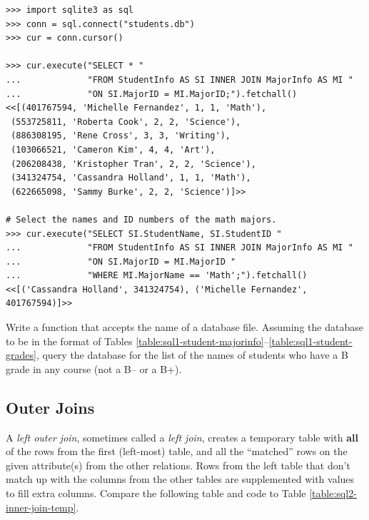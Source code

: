 \begin{lstlisting}
>>> import sqlite3 as sql
>>> conn = sql.connect("students.db")
>>> cur = conn.cursor()

>>> cur.execute("SELECT * "
...             "FROM StudentInfo AS SI INNER JOIN MajorInfo AS MI "
...             "ON SI.MajorID = MI.MajorID;").fetchall()
<<[(401767594, 'Michelle Fernandez', 1, 1, 'Math'),
 (553725811, 'Roberta Cook', 2, 2, 'Science'),
 (886308195, 'Rene Cross', 3, 3, 'Writing'),
 (103066521, 'Cameron Kim', 4, 4, 'Art'),
 (206208438, 'Kristopher Tran', 2, 2, 'Science'),
 (341324754, 'Cassandra Holland', 1, 1, 'Math'),
 (622665098, 'Sammy Burke', 2, 2, 'Science')]>>

# Select the names and ID numbers of the math majors.
>>> cur.execute("SELECT SI.StudentName, SI.StudentID "
...             "FROM StudentInfo AS SI INNER JOIN MajorInfo AS MI "
...             "ON SI.MajorID = MI.MajorID "
...             "WHERE MI.MajorName == 'Math';").fetchall()
<<[('Cassandra Holland', 341324754), ('Michelle Fernandez', 401767594)]>>
\end{lstlisting}

\begin{problem} %
Write a function that accepts the name of a database file.
Assuming the database to be in the format of Tables \ref{table:sql1-student-majorinfo}--\ref{table:sql1-student-grades}, query the database for the list of the names of students who have a B grade in any course (not a B-- or a B+).
\end{problem}

\subsection*{Outer Joins} %

A \emph{left outer join}, sometimes called a \emph{left join}, creates a temporary table with \textbf{all} of the rows from the first (left-most) table, and all the ``matched'' rows on the given attribute(s) from the other relations.
Rows from the left table that don't match up with the columns from the other tables are supplemented with  values to fill extra columns.
Compare the following table and code to Table \ref{table:sql2-inner-join-temp}.


